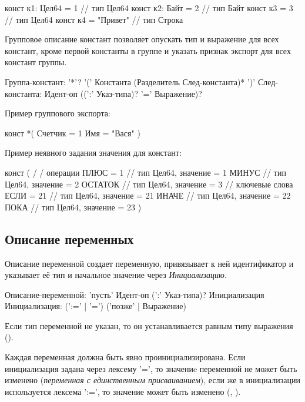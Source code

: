 \begin{Trivil}
конст к1: Цел64 = 1 // тип Цел64
конст к2: Байт = 2 // тип Байт
конст к3 = 3 // тип Цел64
конст к4 = "Привет" // тип Строка
\end{Trivil}

Групповое описание констант позволяет опускать тип и выражение для всех констант, кроме первой константы в группе и указать признак экспорт для всех констант группы.

\begin{Grammar}
Группа-констант: 
    '*'? '(' 
    Константа (Разделитель След-константа)* 
    ')'
След-константа: Идент-оп ((':' Указ-типа)? '=' Выражение)?
\end{Grammar} 

Пример группового экспорта:
\begin{Trivil}[vspace=2pt]
конст *(
    Счетчик = 1
    Имя = "Вася"
)
\end{Trivil}

Пример неявного задания значения для констант:
\begin{Trivil}[vspace=2pt]
конст ( 
    / / операции
    ПЛЮС = 1   // тип Цел64, значение = 1
    МИНУС       // тип Цел64, значение = 2  
    ОСТАТОК   // тип Цел64, значение = 3 
    // ключевые слова
    ЕСЛИ = 21   // тип Цел64, значение = 21
    ИНАЧЕ        // тип Цел64, значение = 22
    ПОКА          // тип Цел64, значение = 23
)
\end{Trivil}


\hypertarget{variables}{%
\subsection{Описание переменных}\label{decls:variables}}

Описание переменной создает переменную, привязывает к ней идентификатор и указывает её тип и начальное значение через \emph{Инициализацию}. 

\begin{Grammar}
Описание-переменной: 
    'пусть' Идент-оп (':' Указ-типа)? Инициализация
Инициализация: (':=' | '=') ('позже' | Выражение)
\end{Grammar} 

Если тип переменной не указан, то он устанавливается равным типу выражения ().

Каждая переменная должна быть явно проинициализирована.
Если инициализация задана через лексему '=', то значениe переменной не может быть изменено (\emph{переменная с единственным присваиванием}), 
если же в инициализации используется лексема ':=', то значение может быть изменено (, ).

